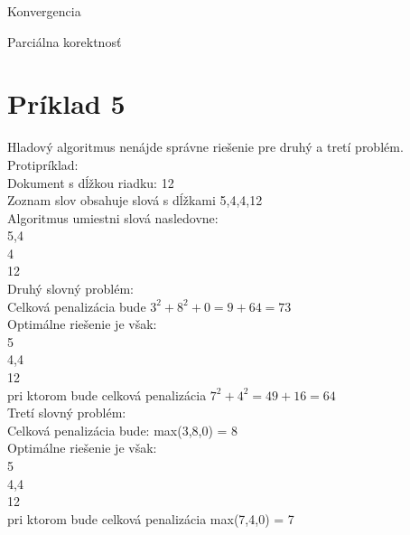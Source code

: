 \documentclass[paper=a4, fontsize=11pt]{scrartcl} %
\numberwithin{equation}{section} %
\numberwithin{figure}{section} %
\numberwithin{table}{section} %
\begin{document}
Konvergencia



Parciálna korektnosť



\pagebreak


\section*{Príklad 5}

Hladový algoritmus nenájde správne riešenie pre druhý a tretí problém. \\
Protipríklad: \\
Dokument s dĺžkou riadku: 12 \\
Zoznam slov obsahuje slová s dĺžkami 5,4,4,12 \\

Algoritmus umiestni slová nasledovne: \\
5,4 \\
4 \\
12 \\

Druhý slovný problém: \\
Celková penalizácia bude $3^2 + 8^2 + 0 = 9 + 64 = 73$ \\

Optimálne riešenie je však: \\
5 \\
4,4 \\
12 \\
pri ktorom bude celková penalizácia $7^2 + 4^2 = 49 + 16 = 64$ \\

Tretí slovný problém: \\
Celková penalizácia bude: max(3,8,0) = 8 \\

Optimálne riešenie je však: \\
5 \\
4,4 \\
12 \\
pri ktorom bude celková penalizácia max(7,4,0) = 7 \\
\end{document}
